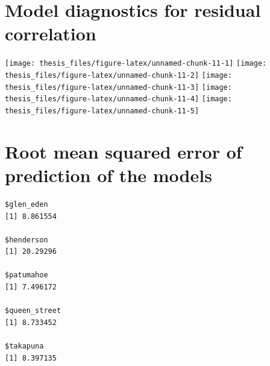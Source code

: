\documentclass{aucklandthesis}
\begin{document}
\hypertarget{model-diagnostics-for-residual-correlation}{%
\section{Model diagnostics for residual correlation}\label{model-diagnostics-for-residual-correlation}}

\texttt{[image: thesis\_files/figure-latex/unnamed-chunk-11-1]}
\texttt{[image: thesis\_files/figure-latex/unnamed-chunk-11-2]}
\texttt{[image: thesis\_files/figure-latex/unnamed-chunk-11-3]}
\texttt{[image: thesis\_files/figure-latex/unnamed-chunk-11-4]}
\texttt{[image: thesis\_files/figure-latex/unnamed-chunk-11-5]}
\newpage

\hypertarget{root-mean-squared-error-of-prediction-of-the-models}{%
\section{Root mean squared error of prediction of the models}\label{root-mean-squared-error-of-prediction-of-the-models}}

\begin{verbatim}
$glen_eden
[1] 8.861554

$henderson
[1] 20.29296

$patumahoe
[1] 7.496172

$queen_street
[1] 8.733452

$takapuna
[1] 8.397135
\end{verbatim}

\printbibliography[heading=bibintoc]
\end{document}
